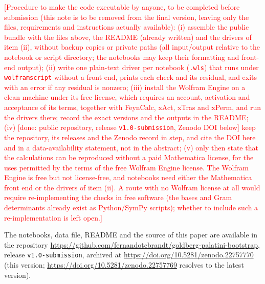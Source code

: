 \documentclass[prd,aps,preprint,superscriptaddress,nofootinbib,amsmath,amssymb,eqsecnum]{revtex4-2}
\newcommand{\todo}[1]{\textcolor{red}{[#1]}}
\begin{document}
\todo{Procedure to make the code executable by anyone, to be completed before submission
(this note is to be removed from the final version, leaving only the files, requirements and
instructions actually available):
(i) assemble the public bundle with the files above, the README (already written) and the
drivers of item (ii), without backup copies or private paths (all input/output relative to the notebook or
script directory; the notebooks may keep their formatting and front-end output);
(ii) write one plain-text driver per notebook
(\texttt{.wls}) that runs under \texttt{wolframscript} without a front end, prints each
check and its residual, and exits with an error if any residual is nonzero;
(iii) install the Wolfram Engine on a clean machine under its free license, which requires
an account, activation and acceptance of its terms,
together with FeynCalc, xAct, xTras and xPerm, and run the drivers there; record the exact
versions and the outputs in the README; (iv) [done: public repository, release \texttt{v1.0-submission}, Zenodo DOI below]
keep the repository, its releases and the Zenodo record in step, and cite the DOI here and
in a data-availability statement, not in the abstract; (v) only then state that the calculations can be
reproduced without a paid Mathematica license, for the uses permitted by the terms of the
free Wolfram Engine license. The Wolfram Engine is free but not license-free, and
notebooks need either the Mathematica front end or the drivers of item (ii). A route with no Wolfram license at all would require re-implementing
the checks in free software (the bases and Gram determinants already exist as Python/SymPy
scripts); whether to include such a re-implementation is left open.}

The notebooks, data file, README and the source of this paper are available in the
repository \url{https://github.com/fernandotcbrandt/goldberg-palatini-bootstrap}, release
\texttt{v1.0-submission}, archived at \url{https://doi.org/10.5281/zenodo.22757770} (this
version; \url{https://doi.org/10.5281/zenodo.22757769} resolves to the latest version).




\end{document}
